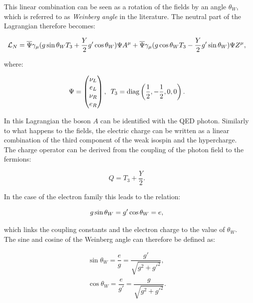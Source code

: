 This linear combination can be seen as a rotation of the fields by an angle $\theta_W$, which is referred to as \emph{Weinberg angle} in the literature. 
The neutral part of the Lagrangian therefore becomes:
 
\begin{equation}
\l_{N}=\bar{\Psi}\gamma_{\mu}(g\operatorname{sin}\theta_{W}T_3+ \frac{Y}{2}g'\operatorname{cos}\theta_{W})\Psi A^{\mu}+\bar{\Psi}\gamma_{\mu}(g\operatorname{cos}\theta_{W}T_3- \frac{Y}{2}g'\operatorname{sin}\theta_{W})\Psi Z^{\mu},
\end{equation}

where:

\begin{equation}
\Psi = \begin{pmatrix}
\nu_L\\ 
e_L\\ 
\nu_R\\ 
e_R
\end{pmatrix}, \, \, \, T_3 = \rm{diag}\left(\frac{1}{2},-\frac{1}{2},0,0\right).
\end{equation}

In this Lagrangian the boson $A$ can be identified with the QED photon. Similarly to what happens to the fields, the electric charge can be written as a linear combination of the third component of the weak isospin and the hypercharge. The charge operator can be derived from the coupling of the photon field to the fermions: 

\begin{equation}
Q = T_3 + \dfrac{Y}{2}.
\end{equation}

In the case of the electron family this leads to the relation:

\begin{equation}
g \opname{sin}\theta_W = g' \opname{cos}\theta_W = e,
\end{equation}

which links the coupling constants and the electron charge to the value of $\theta_W$. The sine and cosine of the Weinberg angle can therefore be defined as:

\begin{equation}
\begin{matrix}
\operatorname{sin}\theta_W = \dfrac{e}{g} = \dfrac{g'}{\sqrt{g^2+g'^2}},\\ 
\operatorname{cos}\theta_W = \dfrac{e}{g'} = \dfrac{g}{\sqrt{g^2+g'^2}}.
\end{matrix}
\label{eq:win_angle}
\end{equation}

